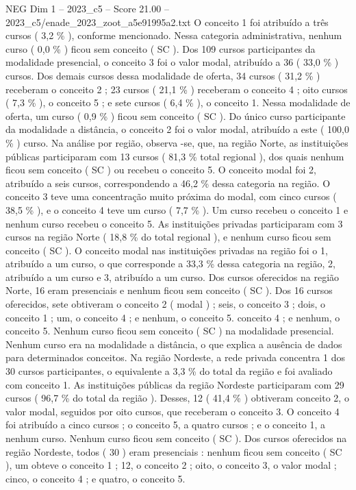 \begin{textsample}{NEG Dim 1 – 2023\_c5 – Score 21.00 – 2023\_c5/enade\_2023\_zoot\_a5e91995a2.txt}
O conceito 1 foi atribuído a três cursos ( 3,2 \% ), conforme mencionado.
Nessa categoria administrativa, nenhum curso ( 0,0 \% ) ficou sem conceito ( SC ).
Dos 109 cursos participantes da modalidade presencial, o conceito 3 foi o valor modal, atribuído a 36 ( 33,0 \% ) cursos.
Dos demais cursos dessa modalidade de oferta, 34 cursos ( 31,2 \% ) receberam o conceito 2 ; 23 cursos ( 21,1 \% ) receberam o conceito 4 ; oito cursos ( 7,3 \% ), o conceito 5 ; e sete cursos ( 6,4 \% ), o conceito 1.
Nessa modalidade de oferta, um curso ( 0,9 \% ) ficou sem conceito ( SC ).
Do único curso participante da modalidade a distância, o conceito 2 foi o valor modal, atribuído a este ( 100,0 \% ) curso.
Na análise por região, observa -se, que, na região Norte, as instituições públicas participaram com 13 cursos ( 81,3 \% total regional ), dos quais nenhum ficou sem conceito ( SC ) ou recebeu o conceito 5.
O conceito modal foi 2, atribuído a seis cursos, correspondendo a 46,2 \% dessa categoria na região.
O conceito 3 teve uma concentração muito próxima do modal, com cinco cursos ( 38,5 \% ), e o conceito 4 teve um curso ( 7,7 \% ).
Um curso recebeu o conceito 1 e nenhum curso recebeu o conceito 5.
As instituições privadas participaram com 3 cursos na região Norte ( 18,8 \% do total regional ), e nenhum curso ficou sem conceito ( SC ).
O conceito modal nas instituições privadas na região foi o 1, atribuído a um curso, o que corresponde a 33,3 \% dessa categoria na região, 2, atribuído a um curso e 3, atribuído a um curso.
Dos cursos oferecidos na região Norte, 16 eram presenciais e nenhum ficou sem conceito ( SC ).
Dos 16 cursos oferecidos, sete obtiveram o conceito 2 ( modal ) ; seis, o conceito 3 ; dois, o conceito 1 ; um, o conceito 4 ; e nenhum, o conceito 5. conceito 4 ; e nenhum, o conceito 5.
Nenhum curso ficou sem conceito ( SC ) na modalidade presencial.
Nenhum curso era na modalidade a distância, o que explica a ausência de dados para determinados conceitos.
Na região Nordeste, a rede privada concentra 1 dos 30 cursos participantes, o equivalente a 3,3 \% do total da região e foi avaliado com conceito 1.
As instituições públicas da região Nordeste participaram com 29 cursos ( 96,7 \% do total da região ).
Desses, 12 ( 41,4 \% ) obtiveram conceito 2, o valor modal, seguidos por oito cursos, que receberam o conceito 3.
O conceito 4 foi atribuído a cinco cursos ; o conceito 5, a quatro cursos ; e o conceito 1, a nenhum curso.
Nenhum curso ficou sem conceito ( SC ).
Dos cursos oferecidos na região Nordeste, todos ( 30 ) eram presenciais : nenhum ficou sem conceito ( SC ), um obteve o conceito 1 ; 12, o conceito 2 ; oito, o conceito 3, o valor modal ; cinco, o conceito 4 ; e quatro, o conceito 5.

\end{textsample}
